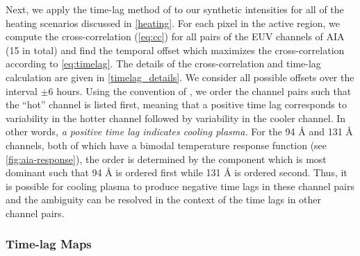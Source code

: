 Next, we apply the time-lag method of \citet{viall_evidence_2012} to our synthetic intensities for all of the heating scenarios discussed in \autoref{heating}. For each pixel in the active region, we compute the cross-correlation (\autoref{eq:cc}) for all pairs of the EUV channels of AIA (15 in total) and find the temporal offset which maximizes the cross-correlation according to \autoref{eq:timelag}. The details of the cross-correlation and time-lag calculation are given in \autoref{timelag_details}. We consider all possible offsets over the interval $\pm6$ hours. Using the convention of \citet{viall_evidence_2012}, we order the channel pairs such that the ``hot'' channel is listed first, meaning that a positive time lag corresponds to variability in the hotter channel followed by variability in the cooler channel. In other words, \textit{a positive time lag indicates cooling plasma.} For the 94 \AA{} and 131 \AA{} channels, both of which have a bimodal temperature response function (see \autoref{fig:aia-response}), the order is determined by the component which is most dominant such that 94 \AA{} is ordered first while 131 \AA{} is ordered second. Thus, it is possible for cooling plasma to produce negative time lags in these channel pairs and the ambiguity can be resolved in the context of the time lags in other channel pairs.

\subsubsection{Time-lag Maps}\label{timelag_maps}

